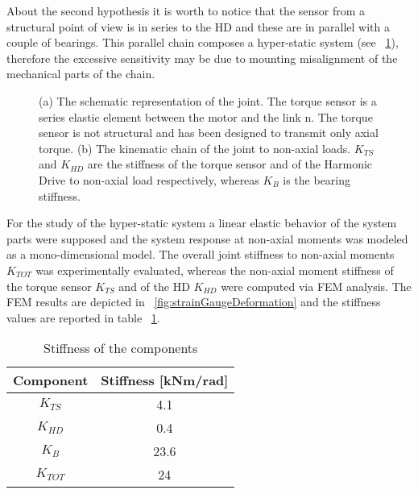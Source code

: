 About the second hypothesis it is worth to notice that the sensor from a structural point of view is in series to the HD and these are in parallel with a couple of bearings. This parallel chain composes a hyper-static system (see \figurename \ \ref{fig:schemaGiuntoEMolle}), therefore the excessive sensitivity may be due to mounting misalignment of the mechanical parts of the chain. 
%
\begin{figure}[b]
	\centering
	\def\svgwidth{1\columnwidth}
	\begin{footnotesize}
		
	\end{footnotesize}
	\caption{(a) The schematic representation of the joint. The torque sensor is a series elastic element between the motor and the link n. The torque sensor is not structural and has been designed to transmit only axial torque. (b) The kinematic chain of the joint to non-axial loads. $K_{TS}$ and $K_{HD}$ are the stiffness of the torque sensor and of the Harmonic Drive to non-axial load respectively, whereas $K_B$ is the bearing stiffness.}
	\label{fig:schemaGiuntoEMolle}
\end{figure}
%
\par For the study of the hyper-static system a linear  elastic behavior of the system parts were supposed and the system response at non-axial moments was modeled as a mono-dimensional model. %
The overall joint stiffness to non-axial moments $K_{TOT}$ was experimentally evaluated, whereas the non-axial moment stiffness of the torque sensor $K_{TS}$ and of the HD $K_{HD}$ were computed via FEM analysis. The FEM results are depicted in \figurename \ \ref{fig:strainGaugeDeformation} and the stiffness values are reported in table \tablename \ \ref{tab:nonAxialStiffness}.
%
%
\begin{table}[]
	\renewcommand{\arraystretch}{1.3}
	\caption{Stiffness of the components}
	\label{tab:nonAxialStiffness}
	\centering
	\begin{tabular}{c c}
		\hline \hline
		\bfseries Component & \bfseries Stiffness [kNm/rad]\\
		\hline
		$K_{TS}$  & 4.1\\
		$K_{HD}$  & 0.4\\
		$K_{B}$   & 23.6\\
		\hline
		$K_{TOT}$   & 24\\
		\hline \hline
	\end{tabular}
\end{table}
